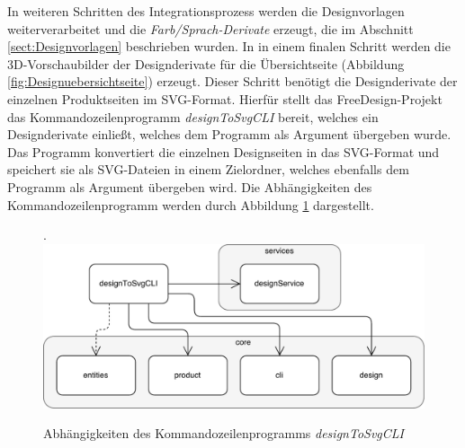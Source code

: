 In weiteren Schritten des Integrationsprozess werden die Designvorlagen weiterverarbeitet und die \emph{Farb/Sprach-Derivate} erzeugt, die im Abschnitt \ref{sect:Designvorlagen} beschrieben wurden. In in einem finalen Schritt werden die 3D-Vorschaubilder der Designderivate für die Übersichtseite (Abbildung \ref{fig:Designuebersichtseite}) erzeugt. Dieser Schritt benötigt die Designderivate der einzelnen Produktseiten im SVG-Format. Hierfür stellt das FreeDesign-Projekt das Kommandozeilenprogramm \emph{designToSvgCLI} bereit, welches ein Designderivate einließt, welches dem Programm als Argument übergeben wurde. Das Programm konvertiert die einzelnen Designseiten in das SVG-Format und speichert sie als SVG-Dateien in einem Zielordner, welches ebenfalls dem Programm als Argument übergeben wird. 
Die Abhängigkeiten des Kommandozeilenprogramm werden durch Abbildung \ref{fig:DesignToSvg} dargestellt.

\begin{figure}[H]
    \centering
    \caption{Abhängigkeiten des Kommandozeilenprogramms \emph{designToSvgCLI}}.
    \includegraphics[width=.9\textwidth]{diagrams/Ist-Architektur/designToSvgCLI-analysis.pdf}
    \label{fig:DesignToSvg}
\end{figure}

